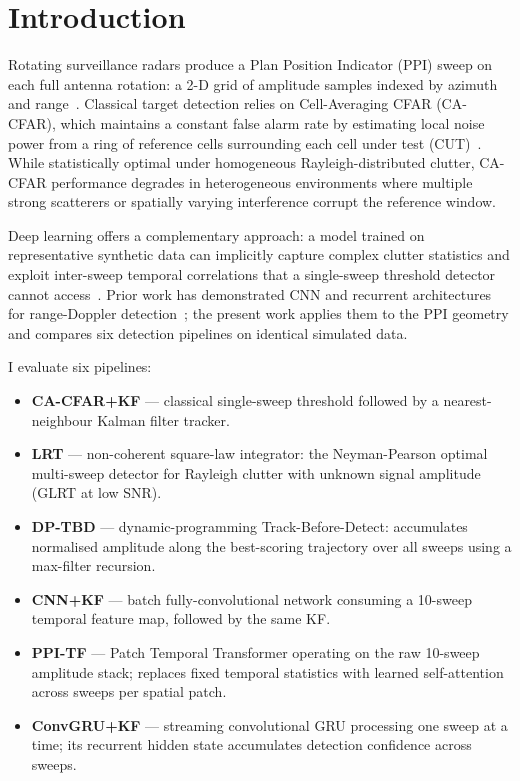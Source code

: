 \documentclass[conference]{IEEEtran}
\begin{document}
\section{Introduction}

Rotating surveillance radars produce a Plan Position Indicator (PPI) sweep
on each full antenna rotation: a 2-D grid of amplitude samples indexed by
azimuth and range~\cite{Skolnik2001}.
Classical target detection relies on Cell-Averaging CFAR (CA-CFAR), which
maintains a constant false alarm rate by estimating local noise power from a
ring of reference cells surrounding each cell under test (CUT)~\cite{Richards2010}.
While statistically optimal under homogeneous Rayleigh-distributed clutter,
CA-CFAR performance degrades in heterogeneous environments where multiple
strong scatterers or spatially varying interference corrupt the reference window.

Deep learning offers a complementary approach: a model trained on
representative synthetic data can implicitly capture complex clutter statistics
and exploit inter-sweep temporal correlations that a single-sweep threshold
detector cannot access~\cite{Geng2021}.
Prior work has demonstrated CNN and recurrent architectures for
range-Doppler detection~\cite{Braca2014}; the present work applies them to
the PPI geometry and compares six detection pipelines
on identical simulated data.

I evaluate six pipelines:
\begin{itemize}
  \item \textbf{CA-CFAR+KF} --- classical single-sweep threshold followed by a
        nearest-neighbour Kalman filter tracker.
  \item \textbf{LRT} --- non-coherent square-law integrator: the
        Neyman-Pearson optimal multi-sweep detector for Rayleigh clutter
        with unknown signal amplitude (GLRT at low SNR).
  \item \textbf{DP-TBD} --- dynamic-programming Track-Before-Detect:
        accumulates normalised amplitude along the best-scoring trajectory
        over all sweeps using a max-filter recursion.
  \item \textbf{CNN+KF} --- batch fully-convolutional network consuming a
        10-sweep temporal feature map, followed by the same KF.
  \item \textbf{PPI-TF} --- Patch Temporal Transformer operating on the
        raw 10-sweep amplitude stack; replaces fixed temporal statistics
        with learned self-attention across sweeps per spatial patch.
  \item \textbf{ConvGRU+KF} --- streaming convolutional GRU processing one
        sweep at a time; its recurrent hidden state accumulates detection
        confidence across sweeps.
\end{itemize}
\end{document}
